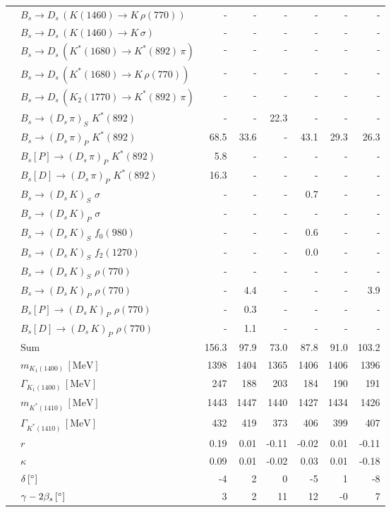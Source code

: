 \begin{tabular}{l l  r  r  r  r  r  r  }
 & $B_s \to D_s \, ( K(1460) \to K \, \rho(770) )$ & -  & -  & -  & -  & -  & -  \\ 
 & $B_s \to D_s \, ( K(1460) \to K \, \sigma )$ & -  & -  & -  & -  & -  & -  \\ 
 & $B_s \to D_s \, ( K^{*}(1680) \to K^{*}(892) \, \pi )$ & -  & -  & -  & -  & -  & -  \\ 
 & $B_s \to D_s \, ( K^{*}(1680) \to K \, \rho(770) )$ & -  & -  & -  & -  & -  & -  \\ 
 & $B_s \to D_s \, ( K_2(1770) \to K^{*}(892) \, \pi )$ & -  & -  & -  & -  & -  & -  \\ 
 & $B_s \to ( D_s \, \pi)_{S} \, \, K^{*}(892)$ & -  & -  & 22.3 & -  & -  & -  \\ 
 & $B_s \to ( D_s \, \pi)_{P} \, \, K^{*}(892)$ & 68.5 & 33.6 & -  & 43.1 & 29.3 & 26.3 \\ 
 & $B_s[P] \to ( D_s \, \pi)_{P} \, \, K^{*}(892)$ & 5.8 & -  & -  & -  & -  & -  \\ 
 & $B_s[D] \to ( D_s \, \pi)_{P} \, \, K^{*}(892)$ & 16.3 & -  & -  & -  & -  & -  \\ 
 & $B_s \to ( D_s \, K)_{S} \, \, \sigma$ & -  & -  & -  & 0.7 & -  & -  \\ 
 & $B_s \to ( D_s \, K)_{P} \, \, \sigma$ & -  & -  & -  & -  & -  & -  \\ 
 & $B_s \to ( D_s \, K)_{S} \, \, f_0(980)$ & -  & -  & -  & 0.6 & -  & -  \\ 
 & $B_s \to ( D_s \, K)_{S} \, \, f_2(1270)$ & -  & -  & -  & 0.0 & -  & -  \\ 
 & $B_s \to ( D_s \, K)_{S} \, \, \rho(770)$ & -  & -  & -  & -  & -  & -  \\ 
 & $B_s \to ( D_s \, K)_{P} \, \, \rho(770)$ & -  & 4.4 & -  & -  & -  & 3.9 \\ 
 & $B_s[P] \to ( D_s \, K)_{P} \, \, \rho(770)$ & -  & 0.3 & -  & -  & -  & -  \\ 
 & $B_s[D] \to ( D_s \, K)_{P} \, \, \rho(770)$ & -  & 1.1 & -  & -  & -  & -  \\ 
 & $\text{Sum}$ & 156.3 & 97.9 & 73.0 & 87.8 & 91.0 & 103.2 \\ 
\hline
 & $m_{K_1(1400)} \, [\text{MeV}]$ & 1398 & 1404 & 1365 & 1406 & 1406 & 1396 \\ 
 & $\Gamma_{K_1(1400)} \, [\text{MeV}]$ & 247 & 188 & 203 & 184 & 190 & 191 \\ 
 & $m_{K^{*}(1410)} \, [\text{MeV}]$ & 1443 & 1447 & 1440 & 1427 & 1434 & 1426 \\ 
 & $\Gamma_{K^{*}(1410)} \, [\text{MeV}]$ & 432 & 419 & 373 & 406 & 399 & 407 \\ 
 & $r$ & 0.19 & 0.01 & -0.11 & -0.02 & 0.01 & -0.11 \\ 
 & $\kappa$ & 0.09 & 0.01 & -0.02 & 0.03 & 0.01 & -0.18 \\ 
 & $\delta \, [^{\circ}]$ & -4 & 2 & 0 & -5 & 1 & -8 \\ 
 & $\gamma - 2 \beta_{s} \, [^{\circ}]$ & 3 & 2 & 11 & 12 & -0 & 7 \\ 
\hline
\hline
\end{tabular}
